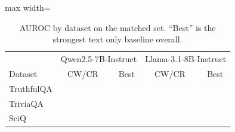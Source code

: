 \begin{table}[t]
\centering
\footnotesize
\caption{AUROC by dataset on the matched set. ``Best'' is the strongest text only baseline overall.}
\label{tab:datasets}
\begin{adjustbox}{max width=\columnwidth}
\begin{tabular}{lrccrcc}
\toprule
 & \multicolumn{3}{c}{Qwen2.5-7B-Instruct} & \multicolumn{3}{c}{Llama-3.1-8B-Instruct} \\
Dataset & CW/CR & \cps{} & Best & CW/CR & \cps{} & Best \\
\midrule
TruthfulQA & \TODO{} & \TODO{} & \TODO{} & \TODO{} & \TODO{} & \TODO{} \\
TriviaQA & \TODO{} & \TODO{} & \TODO{} & \TODO{} & \TODO{} & \TODO{} \\
SciQ & \TODO{} & \TODO{} & \TODO{} & \TODO{} & \TODO{} & \TODO{} \\
\bottomrule
\end{tabular}
\end{adjustbox}
\end{table}
